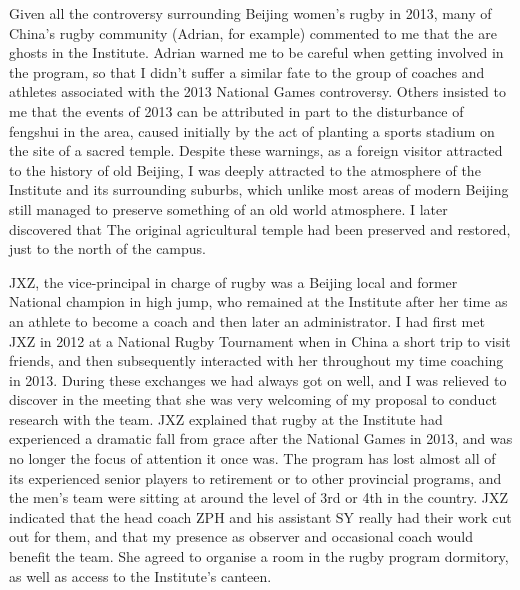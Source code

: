 Given all the controversy surrounding Beijing women's rugby in 2013, many of China's rugby community (Adrian, for example) commented to me that the are ghosts in the Institute. Adrian warned me to be careful when getting involved in the program, so that I didn't suffer a similar fate to the group of coaches and athletes associated with the 2013 National Games controversy. Others insisted to me that the events of 2013 can be attributed in part to the disturbance of fengshui in the area, caused initially by the act of planting a sports stadium on the site of a sacred temple.  Despite these warnings, as a foreign visitor attracted to the history of old Beijing, I was deeply attracted to the atmosphere of the Institute and its surrounding suburbs, which unlike most areas of modern Beijing still managed to preserve something of an old world atmosphere.  I later discovered that The original agricultural temple had been preserved and restored, just to the north of the campus.

JXZ, the vice-principal in charge of rugby was a Beijing local and former National champion in high jump, who remained at the Institute after her time as an athlete to become a coach and then later an administrator.  I had first met JXZ in 2012 at a National Rugby Tournament when in China a short trip to visit friends, and then subsequently interacted with her throughout my time coaching in 2013. During these exchanges we had always got on well, and I was relieved to discover in the meeting
that she was very welcoming of my proposal to conduct research with the team.  JXZ explained that rugby at the Institute had experienced a dramatic fall from grace after the National Games in 2013, and was no longer the focus of attention it once was. The program has lost almost all of its experienced senior players to retirement or to other provincial programs, and the men's team were sitting at around the level of 3rd or 4th in the country.  JXZ indicated that the head coach ZPH and his assistant SY really had their work cut out for them, and that my presence as observer and occasional coach would benefit the team.  She agreed to organise a room in the rugby program dormitory, as well as access to the Institute's canteen.

